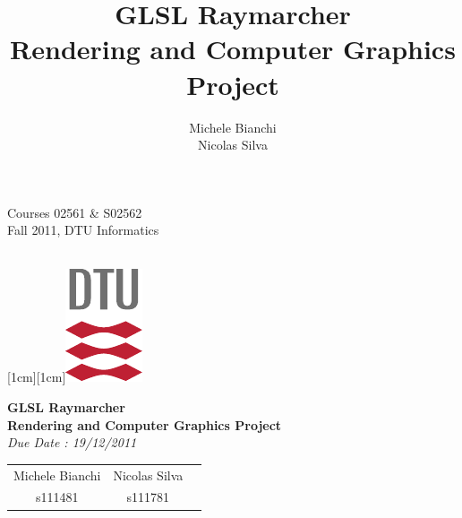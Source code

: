 \documentclass[9pt,a4paper]{scrreprt}
\title{GLSL Raymarcher \\ Rendering and Computer Graphics Project}
\author{ Michele Bianchi \\ Nicolas Silva }
\begin{document}

\noindent\parbox[t]{9cm}{\textsf{Courses 02561 \& S02562 \\
Fall 2011, DTU Informatics }}
\hfill
\parbox[t]{1cm}{\mbox{}\\
\raisebox{0.0cm}[1cm][1cm]{\includegraphics[origin=lb]{dtu_logo_cmyk.pdf}}}

\vspace{3cm}

\begin{center}
{\Huge \bf GLSL Raymarcher \\ Rendering and Computer Graphics Project}\\
\vspace{0.3cm}
{\it Due Date : 19/12/2011}\\ 
\vspace{1cm}
\vspace{0.3cm}
\begin{tabular}{ccc}
{\large Michele Bianchi}&{\large Nicolas Silva}\\
s111481&s111781&
\end{tabular}\\
\end{center}


\newpage


\newpage

\newpage

\newpage

\newpage

\end{document}
